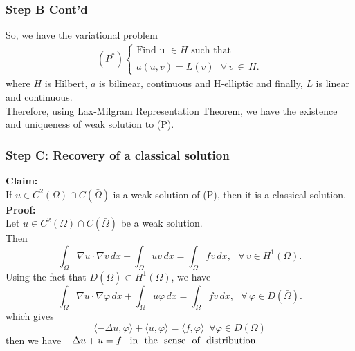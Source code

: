 \documentclass[7pt]{beamer}
\newcommand{\Om}{\Omega}
\newcommand{\vp}{\varphi}
\begin{document}
\begin{frame}
 \frametitle{Step B Cont'd}
So, we have the variational problem
\begin{eqnarray}
(P^*) \left \{
\begin{array}{lll}
\text{Find u}\,\,\in H\,\, \text{such that}\\
\\
a(u,v) = L(v)\,\,\,\,\forall\,v\,\in\,H.
\end{array}
\right. \label{vp}
\end{eqnarray}
where $H$ is Hilbert, $a$ is bilinear, continuous and H-elliptic and finally, $L$ is linear and continuous.\\
Therefore, using Lax-Milgram Representation Theorem, we have the existence and uniqueness of weak solution to (P).
\end{frame}

\begin{frame}
 \frametitle{Step C: Recovery of a classical solution}
\textbf{Claim:}\\
If $u\in C^2(\Om)\cap C(\bar\Om)$ is a weak solution of (P), then it
is a classical solution.\\
\textbf{Proof:}\\
Let $u\in C^2(\Om)\cap C(\bar\Om)$ be a weak solution.\\
Then 
$$
\int_\Om \nabla u\cdot \nabla v\,dx + \int_{\Om} uv \,dx = \int_\Om
fv\,dx,\,\,\,\,\forall\,v\in H^1(\Om).
$$
Using the fact that $D(\bar\Om)\subset H^1(\Om)$, we have
$$
\int_\Om \nabla u\cdot \nabla \vp\,dx + \int_{\Om} u\vp \,dx = \int_\Om
fv\,dx,\,\,\,\,\forall\,\vp\in D(\bar\Om).
$$
which gives
$$\langle{-\Delta u,\vp}\rangle + \langle{u,\vp}\rangle= \langle{f,\vp}\rangle \,\,\,\forall\vp\in D(\Om)$$ then  we have
$-\Delta u + u = f\,\,\,\,\,\text{in \,\,the \,\,sense \,\,of \,\,distribution}.$\\
\end{frame}
\end{document}
